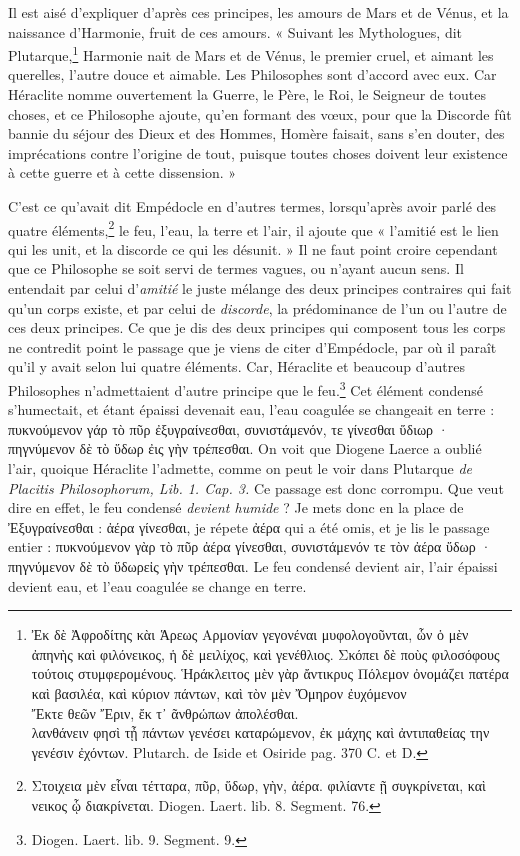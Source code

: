 \documentclass[a4paper, 18pt, oneside]{article}
\begin{document}
Il est aisé d'expliquer d'après ces principes, les amours de Mars et de Vénus, et la naissance d'Harmonie, fruit de ces amours. « Suivant les Mythologues, dit Plutarque,\footnote{Ἐκ δὲ Ἀφροδίτης κὰι Ἁρεως Αρμονίαν γεγονέναι μυφολογοῦνται, ὧν ὁ μὲν ἀπηνὴς καὶ φιλόνεικος, ἡ δὲ μειλίχος, καὶ γενέθλιος. Σκόπει δὲ ποὺς φιλοσόφους τούτοις στυμφερομένους. Ἡράκλειτος μὲν γὰρ ἄντικρυς Πόλεμον ὀνομάζει πατέρα καὶ βασιλέα, καὶ κύριον πάντων, καὶ τὸν μὲν Ὄμηρον ἐυχόμενον\\\hspace*{5mm}Ἔκτε θεῶν Ἔριν, ἔκ τ᾽ ᾶνθρώπων ἀπολέσθαι.\\\hspace*{5mm}λανθάνειν φησὶ τᾖ πάντων γενέσει καταρώμενον, ἐκ μάχης καὶ ἀντιπαθείας την γενέσιν ἐχόντων. Plutarch. de Iside et Osiride pag. 370 C. et D.} Harmonie nait de Mars et de Vénus, le premier cruel, et aimant les querelles, l'autre douce et aimable. Les Philosophes sont d'accord avec eux. Car Héraclite nomme ouvertement la Guerre, le Père, le Roi, le Seigneur de toutes choses, et ce Philosophe ajoute, qu'en formant des vœux, pour que la Discorde fût bannie du séjour des Dieux et des Hommes, Homère faisait, sans s'en douter, des imprécations contre l'origine de tout, puisque toutes choses doivent leur existence à cette guerre et à cette dissension. »

C'est ce qu'avait dit Empédocle en d'autres termes, lorsqu'après avoir parlé des quatre éléments,\footnote{Στοιχεια μὲν εἶναι τέτταρα, πῦρ, ὕδωρ, γὴν, ἀέρα. φιλίαντε ῇ συγκρίνεται, καὶ νεικος ᾧ διακρίνεται. Diogen. Laert. lib. 8. Segment. 76.} le feu, l'eau, la terre et l'air, il ajoute que « l'amitié est le lien qui les unit, et la discorde ce qui les désunit. » Il ne faut point croire cependant que ce Philosophe se soit servi de termes vagues, ou n'ayant aucun sens. Il entendait par celui d'\emph{amitié} le juste mélange des deux principes contraires qui fait qu'un corps existe, et par celui de \emph{discorde}, la prédominance de l'un ou l'autre de ces deux principes. Ce que je dis des deux principes qui composent tous les corps ne contredit point le passage que je viens de citer d'Empédocle, par où il paraît qu'il y avait selon lui quatre éléments. Car, Héraclite et beaucoup d'autres Philosophes n'admettaient d'autre principe que le feu.\footnote{Diogen. Laert. lib. 9. Segment. 9.} Cet élément condensé s'humectait, et étant épaissi devenait eau, l'eau coagulée se changeait en terre : πυκνούμενον γάρ τὸ πῦρ ἐξυγραίνεσθαι, συνιστάμενόν, τε γίνεσθαι ὕδιωρ · πηγνύμενον δὲ τὸ ὕδωρ ἐις γὴν τρέπεσθαι. On voit que Diogene Laerce a oublié l'air, quoique Héraclite l'admette, comme on peut le voir dans Plutarque \emph{de Placitis Philosophorum, Lib. 1. Cap. 3.} Ce passage est donc corrompu. Que veut dire en effet, le feu condensé \emph{devient humide} ? Je mets donc en la place de Ἐξυγραίνεσθαι : ἀέρα γίνεσθαι, je répete ἀέρα qui a été omis, et je lis le passage entier : πυκνούμενον γὰρ τὸ πῦρ ἀέρα γίνεσθαι, συνιστάμενόν τε τὸν ἀέρα ὕδωρ · πηγνύμενον δὲ τὸ ὕδωρεἰς γὴν τρέπεσθαι. Le feu condensé devient air, l'air épaissi devient eau, et l'eau coagulée se change en terre.
\end{document}

